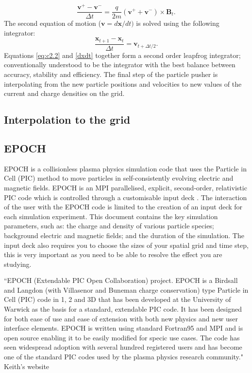 \begin{equation}
\frac{\textbf{v}^{+} - \textbf{v}^{-}}{\Delta t} = \frac{q}{2m} \left( \textbf{v}^{+} + \textbf{v}^{-} \right) \times \textbf{B}_{t}.
\label{eq:c2.2}
\end{equation} The second equation of motion ($\mathbf{v}=d\mathbf{x}/dt)$ is solved using the following integrator:
\begin{equation}
    \frac{\mathbf{x}_{t+1}-\mathbf{x}_t}{\Delta t} =\mathbf{v}_{t+\Delta t/2}.
\label{dxdt}
\end{equation} Equations \ref{eq:c2.2} and \ref{dxdt} together form a second order leapfrog integrator; conventionally understood to be the integrator with the best balance between accuracy, stability and efficiency. The final step of the particle pusher is interpolating from the new particle positions and velocities to new values of the current and charge densities on the grid.
\subsection{Interpolation to the grid}
\subsection{EPOCH}
EPOCH is a collisionless plasma physics simulation code that uses the Particle in Cell (PIC) method to move particles in self-consistently evolving electric and magnetic fields. EPOCH is an MPI parallelised, explicit, second-order, relativistic PIC code which is controlled through a customisable input deck \cite{Arber2015}.
 The interaction of the user with the EPOCH code is limited to the creation of an input deck for each simulation experiment. This document contains the key simulation parameters, such as: the charge and density of various particle species; background electric and magnetic fields; and the duration of the simulation. The input deck also requires you to choose the sizes of your spatial grid and time step, this is very important as you need to be able to resolve the effect you are studying.
 
``EPOCH (Extendable PIC Open Collaboration) project. EPOCH is a Birdsall and Langdon (with Villasenor and Buneman charge conservation) type Particle in Cell (PIC) code in 1, 2 and 3D that has been developed at the University of Warwick as the basis for a standard, extendable PIC code. It has been designed for both ease of use and ease of extension with both new physics and new user interface elements. EPOCH is written using standard Fortran95 and MPI and is open source enabling it to be easily modified for specic use cases. The code has seen widespread adoption with several hundred registered users and has become one of the standard PIC codes used by the plasma physics research community." Keith's website



